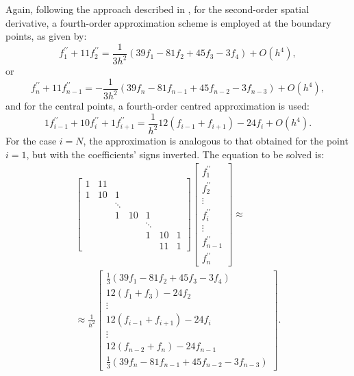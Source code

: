 \documentclass[preprint, 12pt]{elsarticle}
\begin{document}
Again, following the approach described in \citet{souza2003}, for the second-order spatial derivative, a fourth-order approximation scheme is employed at the boundary points, as given by:
\begin{equation}
    f_1^{\prime \prime} + 11f_{2}^{\prime \prime} = \frac{1}{3h^{2}}\left(39f_{1} - 81f_{2} + 45f_{3} - 3f_{4}\right)+O\left(h^4\right),
\end{equation}
or
\begin{equation}
    f_{n}^{\prime \prime} + 11f_{n-1}^{\prime \prime} = -\frac{1}{3h^{2}}\left(39f_{n} - 81f_{n-1} + 45f_{n-2} - 3f_{n-3}\right)+O\left(h^4\right),
\end{equation}
and for the central points, a fourth-order centred approximation is used:
\begin{equation}
    1 f_{i-1}^{\prime \prime}+10 f_i^{\prime \prime}+1 f_{i+1}^{\prime \prime}=\frac{1}{ h^2}12\left(f_{i-1} + f_{i+1}\right) -24f_{i}+O\left(h^4\right) .
\end{equation}
For the case $i=N$, the approximation is analogous to that obtained for the point $i=1$, but with the coefficients' signs inverted. The equation to be solved is: 
\begin{align}
\left[\begin{array}{ccccccc}
    1 & 11 & & & & & \\
    1 & 10 & 1 & & & & \\
    & & \ddots & & & & \\
    & & 1 & 10 & 1 & & \\
    & & & & \ddots & & \\
    & & & & 1 & 10 & 1 \\
    & & & & & 11 & 1
\end{array}\right]\left[\begin{array}{c}
    f_1^{\prime \prime} \\
    f_2^{\prime \prime} \\
    \vdots \\
    f_i^{\prime \prime} \\
    \vdots \\
    f_{n-1}^{\prime \prime} \\
    f_n^{\prime \prime}
\end{array}\right] \approx \nonumber\\ \approx \frac{1}{h^2}\left[\begin{array}{c}\frac{1}{3}\left(39f_1 - 81f_2 + 45f_3 - 3f_4\right) \\ 12\left(f_1 + f_3\right) -24f_2 \\ \vdots \\ 12\left(f_{i-1} + f_{i+1}\right) -24f_{i} \\ \vdots \\ 12\left(f_{n-2} + f_{n}\right) -24f_{n-1}  \\ \frac{1}{3}\left(39f_{n} - 81f_{n-1} + 45f_{n-2} - 3f_{n-3}\right)\end{array}\right].
\end{align}
\end{document}
